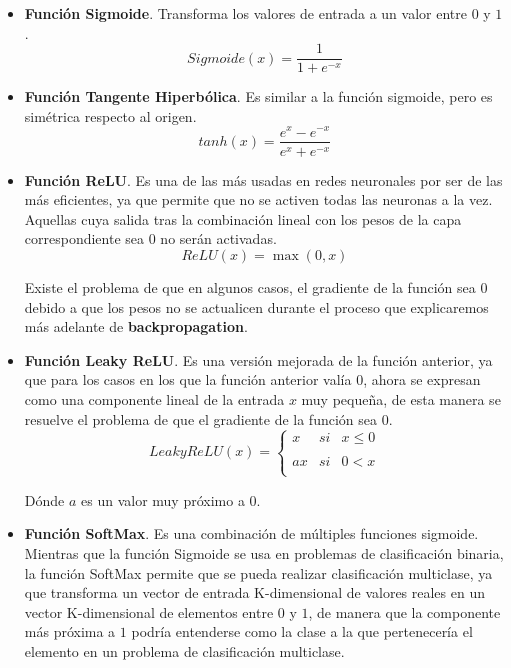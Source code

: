             \begin{itemize}
                \item \textbf{Función Sigmoide}. Transforma los valores de entrada a un valor entre $0$ y $1$.
                \begin{equation}
                    Sigmoide(x)=\frac{1}{1+e^{-x}}
                \end{equation}
                \item \textbf{Función Tangente Hiperbólica}. Es similar a la función sigmoide, pero es simétrica respecto al origen. 
                \begin{equation}
                    tanh(x)=\frac{e^x - e^{-x}}{e^x + e^{-x}} 
                \end{equation}
                \item \textbf{Función ReLU}. Es una de las más usadas en redes neuronales por ser de las más eficientes, ya que permite que no se activen todas las neuronas a la vez. Aquellas cuya salida tras la combinación lineal con los pesos de la capa correspondiente sea 0 no serán activadas.
                \begin{equation}
                    ReLU(x)=\max(0,x)
                \end{equation}

                \noindent Existe el problema de que en algunos casos, el gradiente de la función sea $0$ debido a que los pesos no se actualicen durante el proceso que explicaremos más adelante de \textbf{backpropagation}.

                \item \textbf{Función Leaky ReLU}. Es una versión mejorada de la función anterior, ya que para los casos en los que la función anterior valía $0$, ahora se expresan como una componente lineal de la entrada $x$ muy pequeña, de esta manera se resuelve el problema de que el gradiente de la función sea $0$. 
                \begin{equation}
                    LeakyReLU(x)=\left\{ \begin{array}{lcc}
                        x &   si  & x \leq 0 \\
                        \\ ax &  si & 0 < x \\
                        \end{array}
                    \right.
                \end{equation}

                \noindent Dónde $a$ es un valor muy próximo a $0$.
                \item \textbf{Función SoftMax}. Es una combinación de múltiples funciones sigmoide. Mientras que la función Sigmoide se usa en problemas de clasificación binaria, la función SoftMax permite que se pueda realizar clasificación multiclase, ya que transforma un vector de entrada K-dimensional de valores reales en un vector K-dimensional de elementos entre $0$ y $1$, de manera que la componente más próxima a $1$ podría entenderse como la clase a la que pertenecería el elemento en un problema de clasificación multiclase.
                

\end{itemize}
